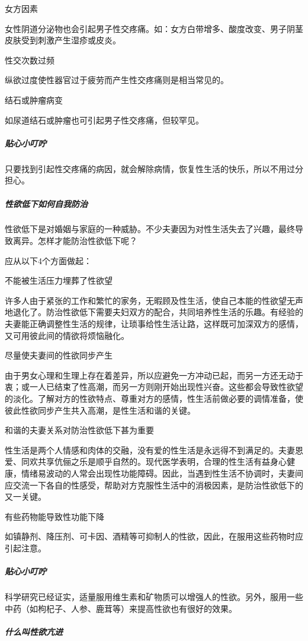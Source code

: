 女方因素

女性阴道分泌物也会引起男子性交疼痛。如：女方白带增多、酸度改变、男子阴茎皮肤受到刺激产生湿疹或皮炎。

性交次数过频

纵欲过度使性器官过于疲劳而产生性交疼痛则是相当常见的。

结石或肿瘤病变

如尿道结石或肿瘤也可引起男子性交疼痛，但较罕见。

\subparagraph{贴心小叮咛}

只要找到引起性交疼痛的病因，就会解除病情，恢复性生活的快乐，所以不用过分担心。

\subparagraph{性欲低下如何自我防治}

性欲低下是对婚姻与家庭的一种威胁。不少夫妻因为对性生活失去了兴趣，最终导致离异。怎样才能防治性欲低下呢？

应从以下4个方面做起：

不能被生活压力埋葬了性欲望

许多人由于紧张的工作和繁忙的家务，无暇顾及性生活，使自己本能的性欲望无声地退化了。防治性欲低下需要夫妇双方的配合，共同培养性生活的乐趣。有经验的夫妻能正确调整性生活的规律，让琐事给性生活让路，这样既可加深双方的感情，又可用彼此间的情欲将烦恼融化。

尽量使夫妻间的性欲同步产生

由于男女心理和生理上存在着差异，所以应避免一方冲动已起，而另一方还无动于衷；或一人已结束了性高潮，而另一方则刚开始出现性兴奋。这些都会导致性欲望的淡化。了解对方的性欲特点、尊重对方的感情，性生活前做必要的调情准备，使彼此性欲同步产生共入高潮，是性生活和谐的关键。

和谐的夫妻关系对防治性欲低下甚为重要

性生活是两个人情感和肉体的交融，没有爱的性生活是永远得不到满足的。夫妻恩爱、同欢共享伉俪之乐是顺乎自然的。现代医学表明，合理的性生活有益身心健康，情绪易波动的人常会出现性功能障碍。因此，当遇到性生活不协调时，夫妻间应交流一下各自的性感受，帮助对方克服性生活中的消极因素，是防治性欲低下的又一关键。

有些药物能导致性功能下降

如镇静剂、降压剂、可卡因、酒精等可抑制人的性欲，因此，在服用这些药物时应引起注意。

\subparagraph{贴心小叮咛}

科学研究已经证实，适量服用维生素和矿物质可以增强人的性欲。另外，服用一些中药（如枸杞子、人参、鹿茸等）来提高性欲也有很好的效果。

\subparagraph{什么叫性欲亢进}

